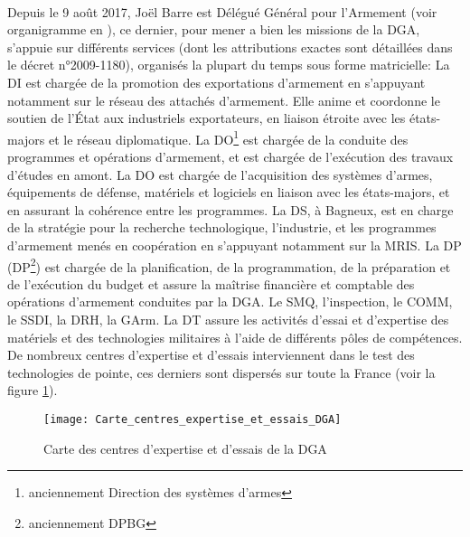 \documentclass[11pt, book, english, french, standardlists]{upmethodology-document}
\begin{document}
				\paragraph*{}
					Depuis le 9 août 2017, Joël Barre est Délégué Général pour l'Armement (voir organigramme en ), ce dernier, pour mener a bien les missions de la \gls{DGA}, s'appuie sur différents services (dont les attributions exactes sont détaillées dans le décret n°2009-1180\cite{DEFD0918712D}), organisés la plupart du temps sous forme matricielle:
					La \gls{DI} est chargée de la promotion des exportations d'armement en s'appuyant notamment sur le réseau des attachés d'armement. Elle anime et coordonne le soutien de l'État aux industriels exportateurs, en liaison étroite avec les états-majors et le réseau diplomatique.
					La \gls{DO}\footnote{anciennement Direction des systèmes d'armes} est chargée de la conduite des programmes et opérations d'armement, et est chargée de l'exécution des travaux d'études en amont. La \gls{DO} est chargée de l'acquisition des systèmes d'armes, équipements de défense, matériels et logiciels en liaison avec les états-majors, et en assurant la cohérence entre les programmes.
					La \gls{DS}, à Bagneux, est en charge de la stratégie pour la recherche technologique, l'industrie, et les programmes d'armement menés en coopération en s'appuyant notamment sur la \gls{MRIS}.
					La \acrlong{DP} (\acrshort{DP}\footnote{anciennement DPBG}) est chargée de la planification, de la programmation, de la préparation et de l'exécution du budget et assure la maîtrise financière et comptable des opérations d'armement conduites par la \gls{DGA}.
					Le \gls{SMQ}, l'inspection, le \gls{COMM}, le \gls{SSDI}, la \gls{DRH}, la \gls{GArm}.
					La \gls{DT} assure les activités d'essai et d'expertise des matériels et des technologies militaires à l'aide de différents pôles de compétences. De nombreux centres d'expertise et d'essais interviennent dans le test des technologies de pointe, ces derniers sont dispersés sur toute la France (voir la figure \ref{fig:Carte_centres_expertise_et_essais_DGA}).
					\begin{figure}[H]
						\centering
						\texttt{[image: Carte\_centres\_expertise\_et\_essais\_DGA]}
						\caption{Carte des centres d'expertise et d'essais de la \acrshort{DGA}\cite{OptroDefDGA}}
						\label{fig:Carte_centres_expertise_et_essais_DGA}
					\end{figure}
\end{document}
